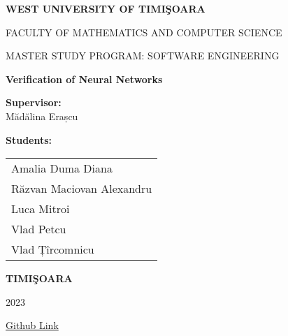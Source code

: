 \documentclass[12pt,a4paper,oneside]{book}
\theoremstyle{definition}
\theoremstyle{remark}
\begin{document}
\sloppy

\thispagestyle{empty}

\newpage
\thispagestyle{empty}
\begin{center}
{\large{\bf WEST UNIVERSITY OF TIMI\c SOARA
		
FACULTY OF MATHEMATICS AND COMPUTER SCIENCE
		
MASTER STUDY PROGRAM:  SOFTWARE ENGINEERING}}

\vspace{200pt}
{\huge {\bf Verification of Neural Networks }}

\vspace{153pt}
\end{center}

\noindent
\begin{minipage}[t]{0.45\textwidth}
    \textbf{Supervisor:} \\
    Mădălina Erașcu \\
\end{minipage}%
\hfill
\begin{minipage}[t]{0.35\textwidth}
    \textbf{Students:} \\
    \begin{tabular}[t]{l}
        Amalia Duma Diana \\
        Răzvan Maciovan Alexandru \\
        Luca Mitroi \\
        Vlad Petcu \\
        Vlad Țîrcomnicu \\
    \end{tabular}
\end{minipage}

 

\vfill
\begin{center}
{\bf TIMI\c SOARA

2023}

\href{https://github.com/razvanmaciovan/Proiect-VF}{Github Link}
\end{center}


\tableofcontents




\end{document}
